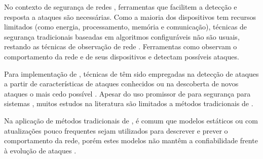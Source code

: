 No contexto de segurança de redes \iot, ferramentas que facilitem a detecção e
resposta a ataques são necessárias.
Como a maioria dos dispositivos \iot tem recursos limitados (como energia,
processamento, memória e comunicação), técnicas de segurança tradicionais
baseadas em algoritmos configuráveis não são usuais, restando as
técnicas de observação de rede \cite{Zhou2017}.
Ferramentas como \nids observam o comportamento da rede e de seus dispositivos
e detectam possíveis ataques.
% 

Para implementação de \nids, técnicas de \ml têm sido empregadas na detecção de
ataques a partir de características de ataques conhecidos ou na
descoberta de novos ataques o mais cedo possível
\cite{buczak2016survey,mitchell2014survey}.
Apesar do uso promissor de \ml para segurança para sistemas \iot, muitos estudos
na literatura \cite{buczak2016survey,mitchell2014survey,Tahsien2020} são
limitados a métodos tradicionais de \ml.

Na aplicação de métodos tradicionais de \ml, é comum que modelos estáticos ou
com atualizações pouco frequentes sejam utilizados para descrever e prever o
comportamento da rede, porém estes modelos não mantêm a confiabilidade frente à
evolução de ataques \cite{Viegas2019,Lopez2019}.




